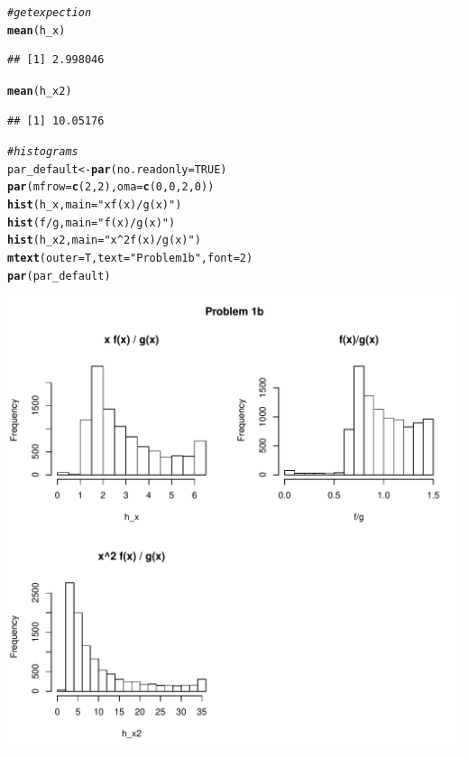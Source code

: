 \documentclass{article}\usepackage[]{graphicx}\usepackage[]{color}
\makeatletter
\def\maxwidth{ %
  \ifdim\Gin@nat@width>\linewidth
    \linewidth
  \else
    \Gin@nat@width
  \fi
}
\newcommand{\hlnum}[1]{\textcolor[rgb]{0.686,0.059,0.569}{#1}}%
\newcommand{\hlstr}[1]{\textcolor[rgb]{0.192,0.494,0.8}{#1}}%
\newcommand{\hlcom}[1]{\textcolor[rgb]{0.678,0.584,0.686}{\textit{#1}}}%
\newcommand{\hlopt}[1]{\textcolor[rgb]{0,0,0}{#1}}%
\newcommand{\hlstd}[1]{\textcolor[rgb]{0.345,0.345,0.345}{#1}}%
\newcommand{\hlkwb}[1]{\textcolor[rgb]{0.69,0.353,0.396}{#1}}%
\newcommand{\hlkwc}[1]{\textcolor[rgb]{0.333,0.667,0.333}{#1}}%
\newcommand{\hlkwd}[1]{\textcolor[rgb]{0.737,0.353,0.396}{\textbf{#1}}}%
\newenvironment{kframe}{%
 \def\at@end@of@kframe{}%
 \ifinner\ifhmode%
  \def\at@end@of@kframe{\end{minipage}}%
  \begin{minipage}{\columnwidth}%
 \fi\fi%
 \def\FrameCommand##1{\hskip\@totalleftmargin \hskip-\fboxsep
 \colorbox{shadecolor}{##1}\hskip-\fboxsep
     \hskip-\linewidth \hskip-\@totalleftmargin \hskip\columnwidth}%
 \MakeFramed {\advance\hsize-\width
   \@totalleftmargin\z@ \linewidth\hsize
   \@setminipage}}%
 {\par\unskip\endMakeFramed%
 \at@end@of@kframe}
\newenvironment{knitrout}{}{} %
\makeatother
\begin{document}
\begin{knitrout}
\begin{kframe}
\begin{alltt}
\hlcom{#get expection}
\hlkwd{mean}\hlstd{(h_x)}
\end{alltt}
\begin{verbatim}
## [1] 2.998046
\end{verbatim}
\begin{alltt}
\hlkwd{mean}\hlstd{(h_x2)}
\end{alltt}
\begin{verbatim}
## [1] 10.05176
\end{verbatim}
\begin{alltt}
\hlcom{#histograms}
\hlstd{par_default} \hlkwb{<-} \hlkwd{par}\hlstd{(}\hlkwc{no.readonly} \hlstd{=} \hlnum{TRUE}\hlstd{)}
\hlkwd{par}\hlstd{(}\hlkwc{mfrow} \hlstd{=} \hlkwd{c}\hlstd{(}\hlnum{2}\hlstd{,} \hlnum{2}\hlstd{),} \hlkwc{oma} \hlstd{=} \hlkwd{c}\hlstd{(}\hlnum{0}\hlstd{,} \hlnum{0}\hlstd{,} \hlnum{2}\hlstd{,} \hlnum{0}\hlstd{))}
\hlkwd{hist}\hlstd{(h_x,} \hlkwc{main} \hlstd{=} \hlstr{"x f(x) / g(x)"}\hlstd{)}
\hlkwd{hist}\hlstd{(f} \hlopt{/} \hlstd{g,} \hlkwc{main} \hlstd{=} \hlstr{"f(x)/g(x)"}\hlstd{)}
\hlkwd{hist}\hlstd{(h_x2,} \hlkwc{main} \hlstd{=} \hlstr{"x^2 f(x) / g(x)"}\hlstd{)}
\hlkwd{mtext}\hlstd{(}\hlkwc{outer} \hlstd{= T,} \hlkwc{text} \hlstd{=} \hlstr{"Problem 1b"}\hlstd{,} \hlkwc{font} \hlstd{=} \hlnum{2}\hlstd{)}
\hlkwd{par}\hlstd{(par_default)}
\end{alltt}
\end{kframe}
\includegraphics[width=\maxwidth]{figure/unnamed-chunk-2-1} 

\end{knitrout}
\end{document}
